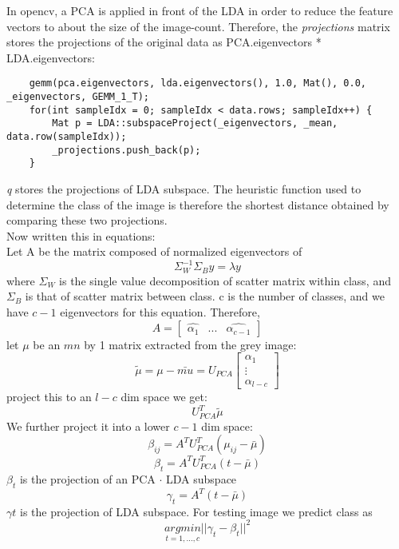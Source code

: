 \documentclass[a4paper]{article}
\begin{document}
	In opencv, a PCA is applied in front of the LDA in order to reduce the feature vectors to about the size of the image-count. Therefore, the \textsl{projections} matrix stores the projections of the original data as PCA.eigenvectors * LDA.eigenvectors: 
	\begin{verbatim}
	gemm(pca.eigenvectors, lda.eigenvectors(), 1.0, Mat(), 0.0, _eigenvectors, GEMM_1_T);
	for(int sampleIdx = 0; sampleIdx < data.rows; sampleIdx++) {
		Mat p = LDA::subspaceProject(_eigenvectors, _mean, data.row(sampleIdx));
		_projections.push_back(p);
	}
	\end{verbatim} 
	\textsl{q} stores the projections of LDA subspace. The heuristic function used to determine the class of the image is therefore the shortest distance obtained by comparing these two projections. \\
	Now written this in equations: \\
	Let A be the matrix composed of normalized eigenvectors of
	\[\Sigma_W^{-1}\Sigma_By = \lambda y\]
	where $\Sigma_W$ is the single value decomposition of scatter matrix within class, and  $\Sigma_B$ is that of scatter matrix between class. c is the number of classes, and we have $c-1$ eigenvectors for this equation. Therefore, 
	\[A = \begin{bmatrix}
	\hat{\alpha_1} &... & \hat{\alpha_{c-1}}
	\end{bmatrix}\]
	\newpage 
	let $\mu$ be an $mn$ by 1 matrix extracted from the grey image: \[\tilde{\mu} = \mu - \bar{mu} = U_{PCA} \begin{bmatrix}
	\alpha_1 \\ \vdots \\ \alpha_{l-c}
	\end{bmatrix}\]
	project this to an $l-c$ dim space we get: \[U_{PCA}^T\tilde{\mu}\] We further project it into a lower $c-1$ dim space: 	
	\[\beta_{ij} = A^{T}U_{PCA}^T(\mu_{ij} - \bar{\mu})\]
	\[\beta_{t} = A^{T}U_{PCA}^T(t - \bar{\mu})\]
	$\beta_{t}$ is the projection of an PCA $\cdot$ LDA subspace
	\[\gamma_{t} = A^T(t - \bar{\mu})\]
	$\gamma{t}$ is the projection of LDA subspace. For testing image we predict class as 
	\[\underset{t = 1,...,c}{argmin}||\gamma_{t} - \beta_{t}||^2\]
	
	
\end{document}
